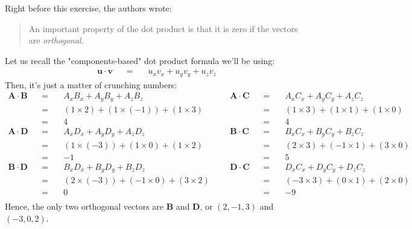 \documentclass[solutions.tex]{subfiles}
\begin{document}
\begin{figure}[H]
\end{figure}
Right before this exercise, the authors wrote:
\begin{quote}
An important property of the dot product is that it is zero
if the vectors are \textit{orthogonal}.
\end{quote}
Let us recall the "components-based" dot product formula we'll
be using:
\begin{equation*} \begin{aligned}
	\bm{u}\cdot\bm{v} &&=\quad& u_xv_x + u_yv_y + u_zv_z
\end{aligned} \end{equation*}
Then, it's just a matter of crunching numbers:
\begin{equation*} \begin{aligned}
	\bm{A}\cdot\bm{B} &&=\quad& A_xB_x + A_yB_y + A_zB_z &&&
		\bm{A}\cdot\bm{C} &&=\quad& A_xC_x + A_yC_y + A_zC_z \\
	~ &&=\quad& (1\times 2) + (1\times (-1)) + (1\times 3) &&&
		~ &&=\quad& (1\times 3) + (1\times 1) + (1\times 0) \\
	~ &&=\quad& \boxed{4} &&&
		~ &&=\quad& \boxed{4} \\
	\bm{A}\cdot\bm{D} &&=\quad& A_xD_x + A_yD_y + A_zD_z &&&
		\bm{B}\cdot\bm{C} &&=\quad& B_xC_x + B_yC_y + B_zC_z \\
	~ &&=\quad& (1\times (-3)) + (1\times 0) + (1\times 2) &&&
		~ &&=\quad& (2\times 3) + (-1\times 1) + (3\times 0) \\
	~ &&=\quad& \boxed{-1} &&&
		~ &&=\quad& \boxed{5} \\
	\bm{B}\cdot\bm{D} &&=\quad& B_xD_x + B_yD_y + B_zD_z &&&
		\bm{D}\cdot\bm{C} &&=\quad& D_xC_x + D_yC_y + D_zC_z \\
	~ &&=\quad& (2\times (-3)) + (-1\times 0) + (3\times 2) &&&
		~ &&=\quad& (-3\times 3) + (0\times 1) + (2\times 0) \\
	~ &&=\quad& \boxed{0} &&&
		~ &&=\quad& \boxed{-9} \\
\end{aligned} \end{equation*}
Hence, the only two orthogonal vectors are $\bm{B}$ and $\bm{D}$, or
$(2,-1,3)$ and $(-3,0,2)$.
\end{document}
